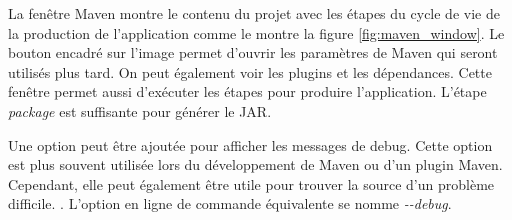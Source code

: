 \subtitle{}

\subtitle{Fenêtre Maven}

La fenêtre Maven montre le contenu du projet avec les étapes du cycle de vie de la production de l'application comme le montre la figure \ref{fig:maven_window}. Le bouton encadré sur l'image permet d'ouvrir les paramètres de Maven qui seront utilisés plus tard. On peut également voir les plugins et les dépendances. Cette fenêtre permet aussi d'exécuter les étapes pour produire l'application. L'étape \textit{package} est suffisante pour générer le JAR.

\begin{minipage}{\linewidth}
\label{fig:maven_window}
\end{minipage}

Une option peut être ajoutée pour afficher les messages de debug. Cette option est plus souvent utilisée lors du développement de Maven ou d'un plugin Maven. Cependant, elle peut également être utile pour trouver la source d'un problème difficile. . L'option en ligne de commande équivalente se nomme \textit{-{}-debug}.